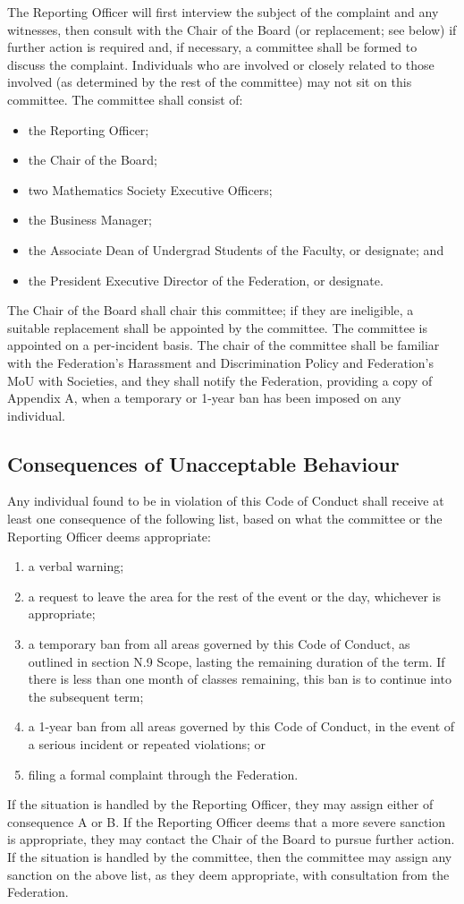 The Reporting Officer will first interview the subject of the complaint and any witnesses, then consult with the Chair of the Board (or replacement; see below) if further action is required and, if necessary, a committee shall be formed to discuss the complaint. Individuals who are involved or closely related to those involved (as determined by the rest of the committee) may not sit on this committee. The committee shall consist of:
\begin{itemize}
	\item the Reporting Officer;
	\item the Chair of the Board;
	\item two Mathematics Society Executive Officers;
	\item the Business Manager;
	\item the Associate Dean of Undergrad Students of the Faculty, or designate; and
	\item the President Executive Director of the Federation, or designate.
\end{itemize}
The Chair of the Board shall chair this committee; if they are ineligible, a suitable replacement shall be appointed by the committee. The committee is appointed on a per-incident basis. The chair of the committee shall be familiar with the Federation's Harassment and Discrimination Policy and Federation's MoU with Societies, and they shall notify the Federation, providing a copy of Appendix A, when a temporary or 1-year ban has been imposed on any individual.

\subsection{Consequences of Unacceptable Behaviour}
Any individual found to be in violation of this Code of Conduct shall receive at least one consequence of the following list, based on what the committee or the Reporting Officer deems appropriate:
\begin{enumerate}[label=\Alph*.]
	\item a verbal warning;
	\item a request to leave the area for the rest of the event or the day, whichever is appropriate;
	\item a temporary ban from all areas governed by this Code of Conduct, as outlined in section N.9 Scope, lasting the remaining duration of the term. If there is less than one month of classes remaining, this ban is to continue into the subsequent term;
	\item a 1-year ban from all areas governed by this Code of Conduct, in the event of a serious incident or repeated violations; or
	\item filing a formal complaint through the Federation.
\end{enumerate}
If the situation is handled by the Reporting Officer, they may assign either of consequence A or B. If the Reporting Officer deems that a more severe sanction is appropriate, they may contact the Chair of the Board to pursue further action. If the situation is handled by the committee, then the committee may assign any sanction on the above list, as they deem appropriate, with consultation from the Federation.

